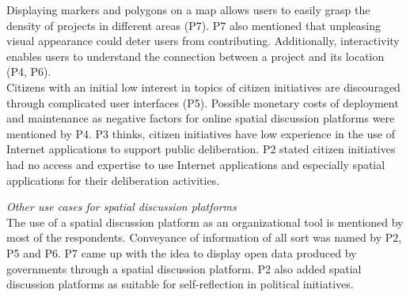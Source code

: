 Displaying markers and polygons on a map allows users to easily grasp the density of projects in different areas (P7). P7 also mentioned that unpleasing visual appearance could deter users from contributing. Additionally, interactivity enables users to understand the connection between a project and its location (P4, P6).\\
Citizens with an initial low interest in topics of citizen initiatives are discouraged through complicated user interfaces (P5). Possible monetary costs of deployment and maintenance as negative factors for online spatial discussion platforms were mentioned by P4. P3 thinks, citizen initiatives have low experience in the use of Internet applications to support public deliberation. P2 stated citizen initiatives had no access and expertise to use Internet applications and especially spatial applications for their deliberation activities.

\textit{Other use cases for spatial discussion platforms}\\
The use of a spatial discussion platform as an organizational tool is mentioned by most of the respondents. Conveyance of information of all sort was named by P2, P5 and P6. P7 came up with the idea to display open data produced by governments through a spatial discussion platform. P2 also added spatial discussion platforms as suitable for self-reflection in political initiatives.

